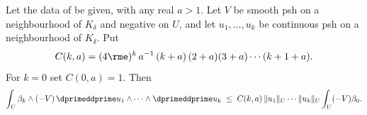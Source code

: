 \begin{theorem}
\label{thm:ch16-weighted-cln}
Let the data of  be given, with any real
$a>1$.  Let $V$ be smooth psh on a neighbourhood of $K_\delta$ and negative
on $U$, and let $u_1,\ldots,u_k$ be continuous psh on a neighbourhood of
$K_\delta$.  Put
\begin{equation}
\label{eq:ch16-cln-constant}
 C(k,a)=(4\rme)^k\,a^{-1}\,(k+a)\,(2+a)(3+a)\cdots(k+1+a).
\end{equation}
For $k=0$ set $C(0,a)=1$.  Then
\begin{equation}
\label{eq:ch16-weighted-cln-main}
 \int_U\beta_k\wedge(-V)\,\dprimeddprime u_1\wedge\cdots\wedge
   \dprimeddprime u_k
 \;\leq\;
 C(k,a)\,\|u_1\|_U\cdots\|u_k\|_U\int_U(-V)\beta_0 .
\end{equation}
\end{theorem}

